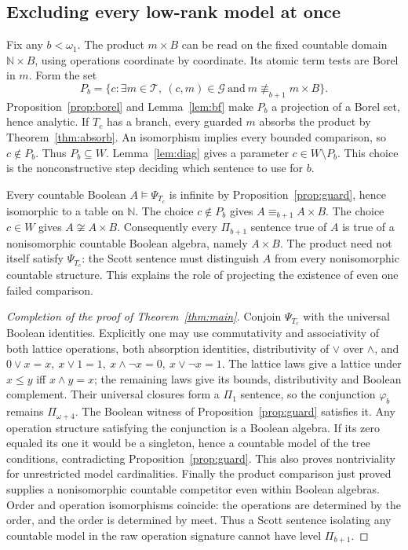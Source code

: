 \documentclass[11pt,letterpaper]{article}
\theoremstyle{definition}\newtheorem{definition}[theorem]{Definition}
\newcommand{\N}{\mathbb N}
\begin{document}
\subsection{Excluding every low-rank model at once}
Fix any \(b<\omega_1\). The product \(m\times B\) can be read on the fixed
countable domain \(\N\times B\), using operations coordinate by coordinate.
Its atomic term tests are Borel in \(m\). Form the set
\[
 P_b=\{c:\exists m\in\mathcal T,\ (c,m)\in\mathcal G
                     \ \text{and}\ m\not\equiv_{b+1}m\times B\}.
\]
Proposition~\ref{prop:borel} and Lemma~\ref{lem:bf} make \(P_b\) a
projection of a Borel set, hence analytic. If \(T_c\) has a branch, every
guarded \(m\) absorbs the product by Theorem~\ref{thm:absorb}. An
isomorphism implies every bounded comparison, so \(c\notin P_b\).
Thus \(P_b\subseteq W\). Lemma~\ref{lem:diag} gives a parameter
\(c\in W\setminus P_b\). This choice is the nonconstructive step deciding
which sentence to use for \(b\).

Every countable Boolean \(A\models\Psi_{T_c}\) is infinite by
Proposition~\ref{prop:guard}, hence isomorphic to a table on \(\N\).
The choice \(c\notin P_b\) gives \(A\equiv_{b+1}A\times B\). The choice
\(c\in W\) gives \(A\not\cong A\times B\). Consequently every
\(\Pi_{b+1}\) sentence true of \(A\) is true of a nonisomorphic countable
Boolean algebra, namely \(A\times B\). The product need not itself
satisfy \(\Psi_{T_c}\): the Scott sentence must distinguish \(A\) from
every nonisomorphic countable structure. This explains the role of
projecting the existence of even one failed comparison.

\begin{proof}[Completion of the proof of Theorem~\ref{thm:main}]
Conjoin \(\Psi_{T_c}\) with the universal Boolean identities. Explicitly
one may use commutativity and associativity of both lattice operations,
both absorption identities, distributivity of \(\vee\) over \(\wedge\),
and \(0\vee x=x,\ x\vee1=1,\ x\wedge\neg x=0,\ x\vee\neg x=1\).
The lattice laws give a lattice under \(x\le y\) iff \(x\wedge y=x\);
the remaining laws give its bounds, distributivity and Boolean complement.
Their universal closures form a \(\Pi_1\) sentence, so the conjunction
\(\varphi_b\) remains \(\Pi_{\omega+4}\). The Boolean witness of
Proposition~\ref{prop:guard} satisfies it. Any operation structure
satisfying the conjunction is a Boolean algebra. If its zero equaled its
one it would be a singleton, hence a countable model of the tree
conditions, contradicting Proposition~\ref{prop:guard}. This also proves
nontriviality for unrestricted model cardinalities. Finally the product
comparison just proved supplies a nonisomorphic countable competitor
even within Boolean algebras. Order and operation isomorphisms coincide:
the operations are determined by the order, and the order is determined
by meet. Thus a Scott sentence isolating any countable model in the raw
operation signature cannot have level \(\Pi_{b+1}\).
\end{proof}
\clearpage
\end{document}
